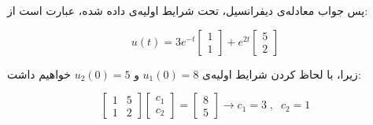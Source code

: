 پس جواب معادله‌ی دیفرانسیل، تحت شرایط اولیه‌ی داده شده، عبارت است از:

$$ u(t) = 3 e^{-t} \begin{bmatrix}
1 \\
1
\end{bmatrix} + e^{2t} \begin{bmatrix}
5 \\
2
\end{bmatrix} $$

زیرا، با لحاظ کردن شرایط اولیه‌ی $u_1(0)=8$ و $u_2(0)=5$ خواهیم داشت:

$$ \begin{bmatrix}
1 & 5 \\
1 & 2
\end{bmatrix}
\begin{bmatrix}
c_1 \\
c_2
\end{bmatrix} =
\begin{bmatrix}
8 \\
5 
\end{bmatrix} \to c_1 = 3 \; , \; \; c_2 = 1 $$


